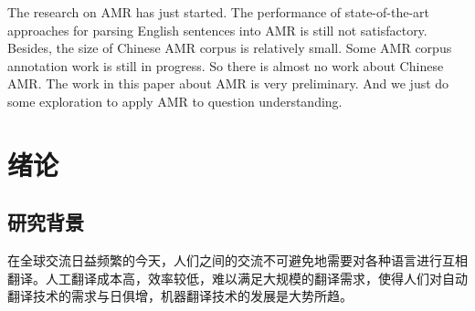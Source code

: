 \documentclass[master, winfont]{njuthesis}
\begin{document}
\begin{englishabstract}
The research on AMR has just started. The performance of state-of-the-art approaches for parsing English sentences into AMR is still not satisfactory. Besides, the size of Chinese AMR corpus is relatively small. Some AMR corpus annotation work is still in progress. So there is almost no work about Chinese AMR. The work in this paper about AMR is very preliminary. And we just do some exploration to apply AMR to question understanding.

\end{englishabstract}

%
%

\tableofcontents

\listoffigures

\listoftables

\mainmatter

\chapter{绪论}\label{chapter_introduction}
\section{研究背景}
在全球交流日益频繁的今天，人们之间的交流不可避免地需要对各种语言进行互相翻译。人工翻译成本高，效率较低，难以满足大规模的翻译需求，使得人们对自动翻译技术的需求与日俱增，机器翻译技术的发展是大势所趋。
\end{document}
